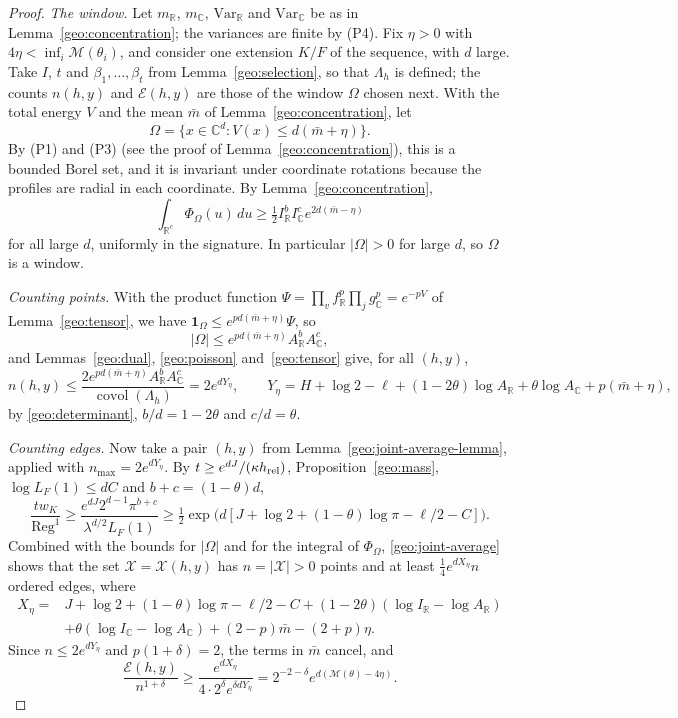 \documentclass[11pt]{amsart}
\numberwithin{equation}{section}
\theoremstyle{definition}
\theoremstyle{remark}
\DeclareMathOperator{\covol}{covol}
\newcommand{\R}{\mathbb R}
\newcommand{\C}{\mathbb C}
\begin{document}
\begin{proof}
\emph{The window.} Let $m_\R$, $m_\C$, $\mathrm{Var}_\R$ and
$\mathrm{Var}_\C$ be as in Lemma~\ref{geo:concentration}; the variances
are finite by (P4). Fix $\eta>0$ with
$4\eta<\inf_i\mathcal M(\theta_i)$, and consider one extension $K/F$ of
the sequence, with $d$ large. Take $I$, $t$ and
$\beta_1,\dots,\beta_t$ from Lemma~\ref{geo:selection}, so that
$\Lambda_h$ is defined; the counts $n(h,y)$ and $\mathcal E(h,y)$ are those
of the window $\Omega$ chosen next. With the total energy $V$ and the mean
$\bar m$ of Lemma~\ref{geo:concentration}, let
\[
 \Omega=\bigl\{x\in\C^d:V(x)\le d(\bar m+\eta)\bigr\}.
\]
By (P1) and (P3) (see the proof of Lemma~\ref{geo:concentration}), this
is a bounded Borel set, and it is invariant under
coordinate rotations because the profiles are radial in each
coordinate. By Lemma~\ref{geo:concentration},
\[
 \int_{\R^c}\Phi_\Omega(u)\,du\ge\tfrac12I_\R^bI_\C^ce^{2d(\bar m-\eta)}
\]
for all large $d$, uniformly in the signature. In particular
$|\Omega|>0$ for large $d$, so $\Omega$ is a window.

\emph{Counting points.} With the product function
$\Psi=\prod_vf_\R^p\prod_jg_\C^p=e^{-pV}$ of Lemma~\ref{geo:tensor}, we
have $\mathbf 1_\Omega\le e^{pd(\bar m+\eta)}\Psi$, so
\[
 |\Omega|\le e^{pd(\bar m+\eta)}A_\R^bA_\C^c,
\]
and Lemmas~\ref{geo:dual}, \ref{geo:poisson} and~\ref{geo:tensor} give,
for all $(h,y)$,
\[
 n(h,y)\le\frac{2e^{pd(\bar m+\eta)}A_\R^bA_\C^c}{\covol(\Lambda_h)}
 =2e^{dY_\eta},\qquad
 Y_\eta=H+\log2-\ell+(1-2\theta)\log A_\R+\theta\log A_\C
 +p(\bar m+\eta),
\]
by \eqref{geo:determinant}, $b/d=1-2\theta$ and $c/d=\theta$.

\emph{Counting edges.} Now take a pair $(h,y)$ from
Lemma~\ref{geo:joint-average-lemma}, applied with
$n_{\max}=2e^{dY_\eta}$. By $t\ge e^{dJ}/(\kappa h_{\rm rel})$,
Proposition~\ref{geo:mass}, $\log L_F(1)\le dC$ and $b+c=(1-\theta)d$,
\[
 \frac{tw_K}{\operatorname{Reg}^1}\ge
 \frac{e^{dJ}2^{d-1}\pi^{b+c}}{\lambda^{d/2}L_F(1)}
 \ge\tfrac12\exp\bigl(d[J+\log2+(1-\theta)\log\pi-\ell/2-C]\bigr).
\]
Combined with the bounds for $|\Omega|$ and for the integral of
$\Phi_\Omega$, \eqref{geo:joint-average} shows that the set
$\mathcal X=\mathcal X(h,y)$ has $n=|\mathcal X|>0$ points and at least
$\tfrac14e^{dX_\eta}n$ ordered edges, where
\[
 \begin{aligned}
 X_\eta={}&J+\log2+(1-\theta)\log\pi-\ell/2-C
 +(1-2\theta)(\log I_\R-\log A_\R)\\
 &+\theta(\log I_\C-\log A_\C)+(2-p)\bar m-(2+p)\eta.
 \end{aligned}
\]
Since $n\le2e^{dY_\eta}$ and $p(1+\delta)=2$, the terms in $\bar m$ cancel,
and
\[
 \frac{\mathcal E(h,y)}{n^{1+\delta}}
 \ge\frac{e^{dX_\eta}}{4\cdot2^\delta e^{\delta dY_\eta}}
 =2^{-2-\delta}e^{d(\mathcal M(\theta)-4\eta)}.
\]


\end{proof}
\end{document}

